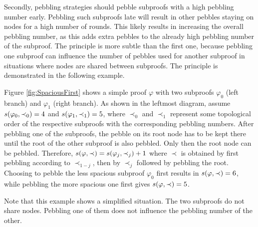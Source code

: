 Secondly, pebbling strategies should pebble subproofs with a high pebbling number early.
Pebbling such subproofs late will result in other pebbles staying on nodes for a high number of rounds.
This likely results in increasing the overall pebbling number, as this adds extra pebbles to the already high pebbling number of the subproof.
The principle is more subtle than the first one, because pebbling one subproof can influence the number of pebbles used for another subproof in situations where nodes are shared between subproofs.
The principle is demonstrated in the following example.

\begin{example}
Figure \ref{fig:SpaciousFirst} shows a simple proof $\varphi$ with two subproofs $\varphi_0$ (left branch) and $\varphi_1$ (right branch). 
As shown in the leftmost diagram, assume $s(\varphi_0,\prec_0) = 4$ and $s(\varphi_1,\prec_1) = 5$, where $\prec_0$ and $\prec_1$ represent some topological order of the respective subproofs with the corresponding pebbling numbers.
After pebbling one of the subproofs, the pebble on its root node has to be kept there until the root of the other subproof is also pebbled. 
Only then the root node can be pebbled. 
Therefore, $s(\varphi,\prec) = s(\varphi_j,\prec_j) + 1$ where $\prec$ is obtained by first pebbling according to $\prec_{1-j}$, then by $\prec_{j}$ followed by pebbling the root.
Choosing to pebble the less spacious subproof $\varphi_0$ first results in $s(\varphi,\prec) = 6$, while pebbling the more spacious one first gives $s(\varphi,\prec) = 5$.

Note that this example shows a simplified situation. 
The two subproofs do not share nodes. 
Pebbling one of them does not influence the pebbling number of the other.


\end{example}
